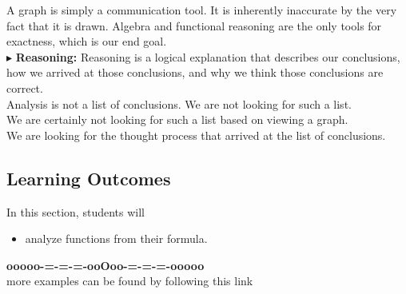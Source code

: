 \documentclass{ximera}
\begin{document}
A graph is simply a communication tool.  It is inherently inaccurate by the very fact that it is drawn.  Algebra and functional reasoning are the only tools for exactness, which is our end goal. \\



$\blacktriangleright$ \textbf{\textcolor{red!70!black}{Reasoning:}} Reasoning is a logical explanation that describes our conclusions, how we arrived at those conclusions, and why we think those conclusions are correct. \\

Analysis is not a list of conclusions. We are not looking for such a list. \\

We are certainly not looking for such a list based on viewing a graph. \\

We are looking for the thought process that arrived at the list of conclusions. \\









\subsection*{Learning Outcomes}



\begin{sectionOutcomes}
In this section, students will 

\begin{itemize}
\item analyze functions from their formula.
\end{itemize}
\end{sectionOutcomes}








\begin{center}
\textbf{\textcolor{green!50!black}{ooooo-=-=-=-ooOoo-=-=-=-ooooo}} \\

more examples can be found by following this link\\ 

\end{center}
\end{document}
